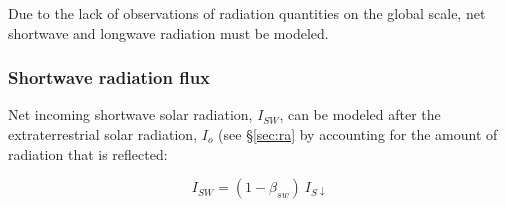 \noindent Due to the lack of observations of radiation quantities on the global scale, net shortwave and longwave radiation must be modeled.

\subsubsection{Shortwave radiation flux}
\label{sec:rs}
Net incoming shortwave solar radiation, $I_{SW}$, can be modeled after the extraterrestrial solar radiation, $I_o$ (see \S \ref{sec:ra} by accounting for the amount of radiation that is reflected:

\begin{equation}
\label{eq:rns}
	I_{SW} = \left(1 - \beta_{sw}\right)\: I_{S\downarrow}
\end{equation}

